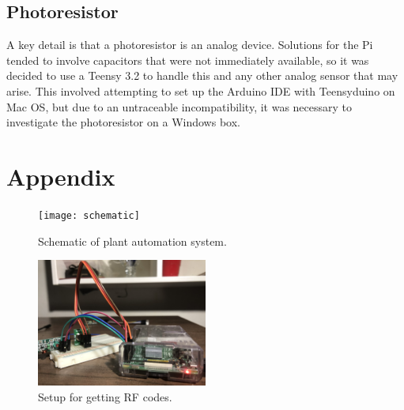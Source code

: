 \documentclass[]{article}
\begin{document}
\subsection{Photoresistor}
A key detail is that a photoresistor is an analog device.  Solutions for the Pi tended to involve capacitors that were not immediately available, so it was decided to use a Teensy 3.2 to handle this and any other analog sensor that may arise.  This involved attempting to set up the Arduino IDE with Teensyduino on Mac OS, but due to an untraceable incompatibility, it was necessary to investigate the photoresistor on a Windows box.


\newpage

\section{Appendix}

\begin{figure}[h]
	\centering
	\texttt{[image: schematic]}
	\caption{Schematic of plant automation system.}
	\label{fig:schematic}
\end{figure}

\begin{figure}[h]
	\centering
	\includegraphics[width=0.5\textwidth]{rf_circuit}
	\caption{Setup for getting RF codes.}
	\label{fig:rf_circuit}
\end{figure}
\end{document}
